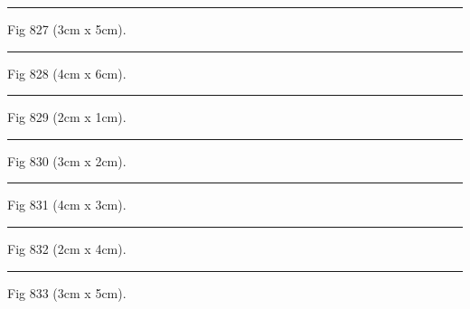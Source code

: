 \documentclass[a4paper,11pt]{article}
\begin{document}
\begin{swarmwrap}%
  \begin{minipage}[t]{3cm}
    \centering
    \rule{\linewidth}{5cm}
    {\footnotesize Fig 827 (3cm x 5cm).}
  \end{minipage}%
\end{swarmwrap}%
\swarmwrapnext
\lipsum[77]%

\begin{swarmwrap}%
  \begin{minipage}[t]{4cm}
    \centering
    \rule{\linewidth}{6cm}
    {\footnotesize Fig 828 (4cm x 6cm).}
  \end{minipage}%
\end{swarmwrap}%
\swarmwrapnext
\lipsum[78]%

\begin{swarmwrap}%
  \begin{minipage}[t]{2cm}
    \centering
    \rule{\linewidth}{1cm}
    {\footnotesize Fig 829 (2cm x 1cm).}
  \end{minipage}%
\end{swarmwrap}%
\swarmwrapnext
\lipsum[79]%

\begin{swarmwrap}%
  \begin{minipage}[t]{3cm}
    \centering
    \rule{\linewidth}{2cm}
    {\footnotesize Fig 830 (3cm x 2cm).}
  \end{minipage}%
\end{swarmwrap}%
\swarmwrapnext
\lipsum[80]%

\begin{swarmwrap}%
  \begin{minipage}[t]{4cm}
    \centering
    \rule{\linewidth}{3cm}
    {\footnotesize Fig 831 (4cm x 3cm).}
  \end{minipage}%
\end{swarmwrap}%
\swarmwrapnext
\lipsum[81]%

\begin{swarmwrap}%
  \begin{minipage}[t]{2cm}
    \centering
    \rule{\linewidth}{4cm}
    {\footnotesize Fig 832 (2cm x 4cm).}
  \end{minipage}%
\end{swarmwrap}%
\swarmwrapnext
\lipsum[82]%

\begin{swarmwrap}%
  \begin{minipage}[t]{3cm}
    \centering
    \rule{\linewidth}{5cm}
    {\footnotesize Fig 833 (3cm x 5cm).}
  \end{minipage}%
\end{swarmwrap}%
\swarmwrapnext
\lipsum[83]%
\end{document}
